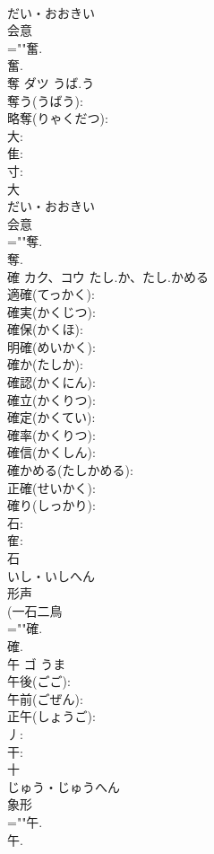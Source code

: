\documentclass[8pt]{extreport}
\begin{document}
\begin{CJK}{UTF8}{min}
\\	だい・おおきい	
\\	会意 
\\	=""奮.
\\	奮.
\\	奪	ダツ	うば.う		
\\	奪う(うばう): 
\\	略奪(りゃくだつ): 
\\	大: 
\\	隹: 
\\	寸: 
\\	大	
\\	だい・おおきい	
\\	会意 
\\	=""奪.
\\	奪.
\\	確	カク、コウ	たし.か、たし.かめる		
\\	適確(てっかく): 
\\	確実(かくじつ): 
\\	確保(かくほ): 
\\	明確(めいかく): 
\\	確か(たしか): 
\\	確認(かくにん): 
\\	確立(かくりつ): 
\\	確定(かくてい): 
\\	確率(かくりつ): 
\\	確信(かくしん): 
\\	確かめる(たしかめる): 
\\	正確(せいかく): 
\\	確り(しっかり): 
\\	石: 
\\	隺: 
\\	石	
\\	いし・いしへん	
\\	形声 
\\	(一石二鳥 
\\	=""確.
\\	確.
\\	午	ゴ	うま		
\\	午後(ごご): 
\\	午前(ごぜん): 
\\	正午(しょうご): 
\\	丿: 
\\	干: 
\\	十	
\\	じゅう・じゅうへん	
\\	象形 
\\	=""午.
\\	午.

\end{CJK}
\end{document}
